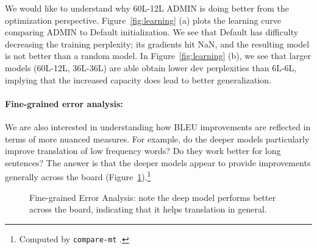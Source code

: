 \documentclass[11pt,a4paper]{article}
\begin{document}
We would like to understand why 60L-12L ADMIN is doing better from the optimization perspective. 
Figure~\ref{fig:learning} (a) plots the learning curve comparing ADMIN to Default initialization. We see that Default has difficulty decreasing the training perplexity; its gradients hit NaN, and the resulting model is not better than a random model.
In Figure~\ref{fig:learning} (b), we see that larger models (60L-12L, 36L-36L) are able obtain lower dev perplexities than 6L-6L, implying that the increased capacity does lead to better generalization.


\paragraph{Fine-grained error analysis:}
We are also interested in understanding how BLEU improvements are reflected in terms of more nuanced measures. For example, do the deeper models particularly improve translation of low frequency words?  Do they work better for long sentences? The answer is that the deeper models appear to provide improvements generally across the board (Figure~\ref{fig:error_analysis}).\footnote{Computed by \texttt{compare-mt} \cite{neubig2019-compare-nmt}.}





\begin{figure}[t]
\centering  
{}
\caption{Fine-grained Error Analysis: note the deep model performs better across the board, indicating that it helps translation in general.}
	\label{fig:error_analysis}	
\end{figure}
\end{document}
